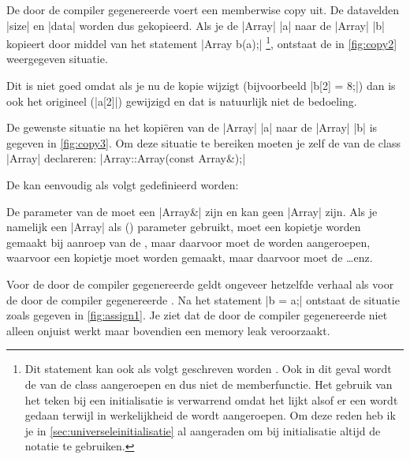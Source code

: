 \begin{cpplstShortInline}
De door de compiler gegenereerde  voert een memberwise copy uit.
De datavelden |size| en |data| worden dus gekopieerd.
Als je de |Array| |a| naar de |Array| |b| kopieert door middel van het statement |Array b(a);|%
\footnote{%
    \label{operator= voetnoot}Dit statement kan ook als volgt geschreven worden .
    Ook in dit geval wordt de  van de class  aangeroepen en dus niet de  memberfunctie.
    Het gebruik van het \cppcode{=} teken bij een initialisatie is verwarrend omdat het lijkt alsof er een  wordt gedaan terwijl in werkelijkheid de  wordt aangeroepen.
    Om deze reden heb ik je in \cref{sec:universeleinitialisatie} al aangeraden om bij initialisatie altijd de notatie  te gebruiken.
}, ontstaat de in \cref{fig:copy2} weergegeven situatie.


Dit is niet goed omdat als je nu de kopie wijzigt (bijvoorbeeld |b[2] = 8;|) dan is ook het origineel (|a[2]|) gewijzigd en dat is natuurlijk niet de bedoeling.

De gewenste situatie na het kopiëren van de |Array| |a| naar de |Array| |b| is gegeven in \cref{fig:copy3}.
Om deze situatie te bereiken moeten je zelf de  van de class |Array| declareren: |Array::Array(const Array&);|


De  kan eenvoudig als volgt gedefinieerd worden: 

De parameter van de  moet een |Array&| zijn en kan geen |Array| zijn.
Als je namelijk een |Array| als () parameter gebruikt, moet een kopietje worden gemaakt bij aanroep van de , maar daarvoor moet de  worden aangeroepen, waarvoor een kopietje moet worden gemaakt, maar daarvoor moet de  \ldots enz.

\label{sec:assignmentoperator}
Voor de door de compiler gegenereerde  geldt ongeveer hetzelfde verhaal als voor de door de compiler gegenereerde .
Na het statement |b = a;| ontstaat de situatie zoals gegeven in \cref{fig:assign1}.
Je ziet dat de door de compiler gegenereerde  niet alleen onjuist werkt maar bovendien een memory leak veroorzaakt.


\end{cpplstShortInline}
